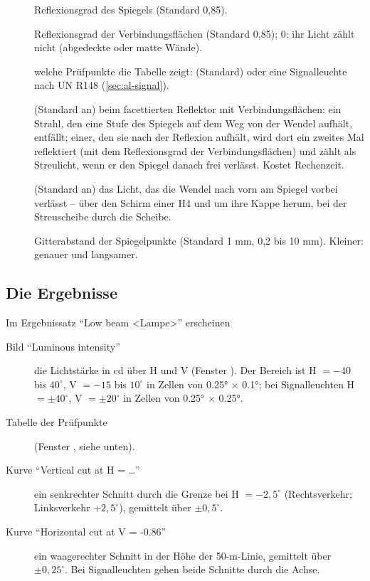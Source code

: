 \begin{description}
  \item[] Reflexionsgrad des Spiegels (Standard 0,85).
  \item[] Reflexionsgrad der Verbindungsflächen (Standard
    0,85); 0: ihr Licht zählt nicht (abgedeckte oder matte Wände).
  \item[] welche Prüfpunkte die Tabelle zeigt: 
    (Standard) oder eine Signalleuchte nach UN R148 (\autoref{sec:al-signal}).
  \item[] (Standard an) beim facettierten Reflektor mit Verbindungsflächen:
    ein Strahl, den eine Stufe des Spiegels auf dem Weg von der Wendel aufhält, entfällt; einer, den
    sie nach der Reflexion aufhält, wird dort ein zweites Mal reflektiert (mit dem Reflexionsgrad der
    Verbindungsflächen) und zählt als Streulicht, wenn er den Spiegel danach frei verlässt. Kostet
    Rechenzeit.
  \item[] (Standard an) das Licht, das die Wendel nach vorn am Spiegel
    vorbei verlässt -- über den Schirm einer H4 und um ihre Kappe herum, bei der Streuscheibe durch
    die Scheibe.
  \item[] Gitterabstand der Spiegelpunkte (Standard 1 mm, 0,2 bis 10 mm).
    Kleiner: genauer und langsamer.
\end{description}

\subsection{Die Ergebnisse}

Im Ergebnissatz \enquote{Low beam <Lampe>} erscheinen

\begin{description}
  \item[Bild \enquote{Luminous intensity}] die Lichtstärke in cd über H und V (Fenster ).
    Der Bereich ist H $= -40$ bis $40^\circ$, V $= -15$ bis $10^\circ$ in Zellen von \ang{0.25}
    $\times$ \ang{0.1}; bei Signalleuchten H $= \pm 40^\circ$, V $= \pm 20^\circ$ in Zellen von
    \ang{0.25} $\times$ \ang{0.25}.
  \item[Tabelle der Prüfpunkte] (Fenster , siehe unten).
  \item[Kurve \enquote{Vertical cut at H = …}] ein senkrechter Schnitt durch die Grenze bei
    H $= -2{,}5^\circ$ (Rechtsverkehr; Linksverkehr $+2{,}5^\circ$), gemittelt über $\pm 0{,}5^\circ$.
  \item[Kurve \enquote{Horizontal cut at V = -0.86}] ein waagerechter Schnitt in der Höhe der
    50-m-Linie, gemittelt über $\pm 0{,}25^\circ$. Bei Signalleuchten gehen beide Schnitte durch die
    Achse.
\end{description}

